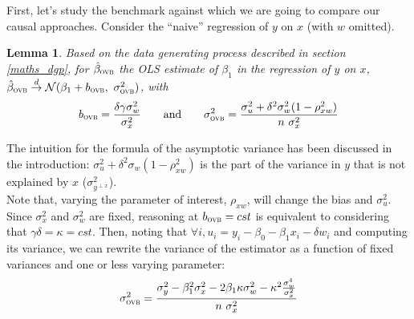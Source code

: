 \documentclass[usletter, 12pt]{article}
\newtheorem{lemma}{Lemma}
\begin{document}
				First, let's study the benchmark against which we are going to compare our causal approaches. Consider the ``naive'' regression of $y$ on $x$ (with $w$ omitted). 
%				
						
				\begin{lemma}\label{lemma_ovb}
					Based on the data generating process described in section \ref{maths_dgp}, for $\hat{\beta}_{\textsc{ovb}}$ the OLS estimate of $\beta_{1}$ in the regression of $y$ on $x$, $\hat{\beta}_{\textsc{ovb}} \overset{d}{\to} \mathcal{N}(\beta_{1} + b_{\textsc{ovb}} , \ \sigma_{\textsc{ovb}}^{2})$, with
					\[
						b_{\textsc{ovb}} = \dfrac{\delta \gamma \sigma_{w}^{2}}{\sigma_{x}^{2}} 
						\qquad \text{and} \qquad
						\sigma_{\textsc{ovb}}^{2} = \dfrac{\sigma_{u}^{2} + \delta^{2} \sigma_{w}^{2}(1 - \rho_{xw}^{2})}{n \ \sigma_{x}^{2}}
					\]
				\end{lemma}
				
			The intuition for the formula of the asymptotic variance has been discussed in the introduction: $\sigma_{u}^{2} + \delta^{2} \sigma_{w}(1 - \rho_{xw}^{2})$ is the part of the variance in $y$ that is not explained by $x$ ($\sigma^{2}_{y^{\perp x}}$).\\
			
			Note that, varying the parameter of interest, $\rho_{xw}$, will change the bias and $\sigma_{u}^{2}$. Since $\sigma_{x}^{2}$ and $\sigma_{w}^{2}$ are fixed, reasoning at $b_{\textsc{ovb}} = cst$ is equivalent to considering that $\gamma \delta = \kappa = cst$. Then, noting that $\forall i, u_{i} = y_i - \beta_{0} - \beta_{1}x_{i} - \delta w_{i}$ and computing its variance, we can rewrite the variance of the estimator as a function of fixed variances and one or less varying parameter:
			~
			\[
				\sigma_{\textsc{ovb}}^{2} = \dfrac{\sigma_{y}^{2} - \beta_{1}^{2}\sigma_{x}^{2} - 2\beta_{1}\kappa\sigma_{w}^{2} - \kappa^{2}\frac{\sigma_{w}^{4}}{\sigma_{x}^{2}}}{n \ \sigma_{x}^{2}}
			\]
			
\end{document}
